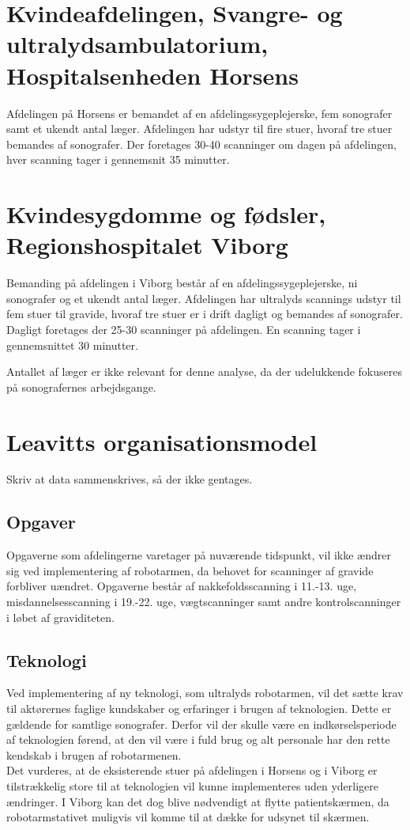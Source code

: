\section{Kvindeafdelingen, Svangre- og ultralydsambulatorium, Hospitalsenheden Horsens}
Afdelingen på Horsens er bemandet af en afdelingssygeplejerske, fem sonografer samt et ukendt antal læger. Afdelingen har udstyr til fire stuer, hvoraf tre stuer bemandes af sonografer. Der foretages 30-40 scanninger om dagen på afdelingen, hver scanning tager i gennemsnit 35 minutter.

\section{Kvindesygdomme og fødsler, Regionshospitalet Viborg}
Bemanding på afdelingen i Viborg består af en afdelingssygeplejerske, ni sonografer og et ukendt antal læger. Afdelingen har ultralyds scannings udstyr til fem stuer til gravide, hvoraf tre stuer er i drift dagligt og bemandes af sonografer. Dagligt foretages der 25-30 scanninger på afdelingen. En scanning tager i gennemsnittet 30 minutter.

Antallet af læger er ikke relevant for denne analyse, da der udelukkende fokuseres på sonografernes arbejdsgange.

\section{Leavitts organisationsmodel}
Skriv at data sammenskrives, så der ikke gentages. 

\subsection{Opgaver}
Opgaverne som afdelingerne varetager på nuværende tidspunkt, vil ikke ændrer sig ved implementering af robotarmen, da behovet for scanninger af gravide forbliver uændret. Opgaverne består af nakkefoldsscanning i 11.-13. uge, misdannelsesscanning i 19.-22. uge, vægtscanninger samt andre kontrolscanninger i løbet af graviditeten. \cite{Bergholt2014}

\subsection{Teknologi}
Ved implementering af ny teknologi, som ultralyds robotarmen, vil det sætte krav til aktørernes faglige kundskaber og erfaringer i brugen af teknologien. Dette er gældende for samtlige sonografer. Derfor vil der skulle være en indkørselsperiode af teknologien førend, at den vil være i fuld brug og alt personale har den rette kendskab i brugen af robotarmenen. \\
Det vurderes, at de eksisterende stuer på afdelingen i Horsens og i Viborg er tilstrækkelig store til at teknologien vil kunne implementeres uden yderligere ændringer. I Viborg kan det dog blive nødvendigt at flytte patientskærmen, da robotarmstativet muligvis vil komme til at dække for udsynet til skærmen.  

